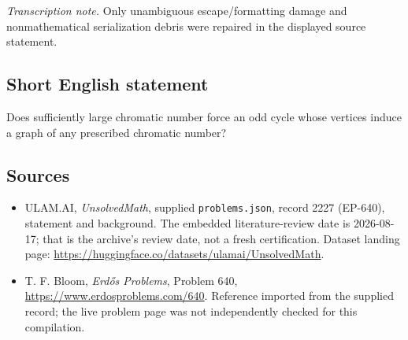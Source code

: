 \documentclass[11pt,a4paper]{article}
\begin{document}
{\small\emph{Transcription note.} Only unambiguous escape/formatting damage and nonmathematical serialization debris were repaired in the displayed source statement.}

\subsection{Short English statement}

Does sufficiently large chromatic number force an odd cycle whose vertices induce a graph of any prescribed chromatic number?

\subsection{Sources}

{\small

\begin{itemize}

\item[\hypertarget{source:2227:1}{S1}] ULAM.AI, \emph{UnsolvedMath}, supplied \texttt{problems.json}, record 2227 (EP-640), statement and background. The embedded literature-review date is 2026-08-17; that is the archive’s review date, not a fresh certification. Dataset landing page: \url{https://huggingface.co/datasets/ulamai/UnsolvedMath}.

\item[\hypertarget{source:2227:2}{S2}] T. F. Bloom, \emph{Erdős Problems}, Problem 640, \url{https://www.erdosproblems.com/640}. Reference imported from the supplied record; the live problem page was not independently checked for this compilation.

\end{itemize}

}

\label{end:2227}
\end{document}

